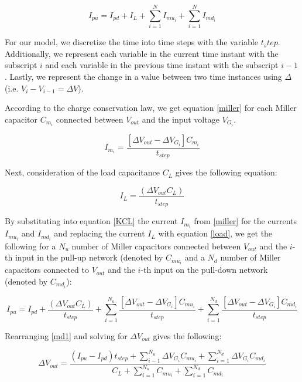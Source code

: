 \begin{equation}\label{KCL}
I_{pu} = I_{pd} + I_L + \sum_{i=1}^{N}I_{mu_i} + \sum_{i=1}^{N}I_{md_i}
\end{equation}

For our model, we discretize the time into time steps with the variable $t_step$. Additionally, we represent each variable in the current time instant with the subscript $i$ and each variable in the previous time instant with the subscript $i-1$. Lastly, we represent the change in a value between two time instances using $\Delta$ (i.e. $V_i-V_{i-1}=\Delta V$). 

According to the charge conservation law, we get equation \ref{miller} for each Miller capacitor $C_{m_i}$ connected between $V_{out}$ and the input voltage $V_{G_i}$.

\begin{equation}\label{miller}
I_{m_i} = \frac{[\Delta V_{out} - \Delta V_{G_i}]C_{m_i}}{t_{step}}
\end{equation}

Next, consideration of the load capacitance $C_L$ gives the following equation:

\begin{equation} \label{load}
I_L = \frac{(\Delta V_{out}C_L)}{t_{step}}
\end{equation}

By substituting into equation \ref{KCL} the current $I_{m_i}$ from \ref{miller} for the currents $I_{mu_i}$ and $I_{md_i}$ and replacing the current $I_L$ with equation \ref{load}, we get the following for a $N_u$ number of Miller capacitors connected between $V_{out}$ and the $i$-th input in the pull-up network (denoted by $C_{mu_i}$ and a $N_d$ number of Miller capacitors connected to $V_{out}$ and the $i$-th input on the pull-down network (denoted by $C_{md_i}$): 

\begin{equation} \label{md1}
I_{pu} = I_{pd} + \frac{(\Delta V_{out}C_L)}{t_{step}} + \sum_{i=1}^{N_u} \frac{[\Delta V_{out} - \Delta V_{G_i}]C_{mu_i}}{t_{step}} + \sum_{i=1}^{N_d} \frac{[\Delta V_{out} - \Delta V_{G_i}]C_{md_i}}{t_{step}}
\end{equation} 

Rearranging \ref{md1} and solving for $\Delta V_{out}$ gives the following:

\begin{equation} \label{md2}
\Delta V_{out} = \frac{(I_{pu}-I_{pd})t_{step} + \sum_{i-1}^{N_u} \Delta V_{G_i}C_{mu_i} + \sum_{i=1}^{N_d} \Delta V_{G_i}C_{md_i}}{C_L + \sum_{i=1}^{N_u}C_{mu_i} + \sum_{i=1}^{N_d}C_{md_i}}
\end{equation}

